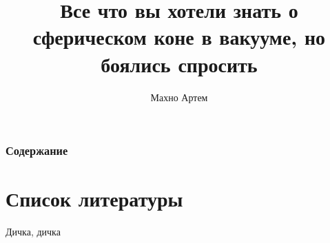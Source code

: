 \documentclass{beamer}
\begin{document}
\title{Все что вы хотели знать о сферическом коне в вакууме, но боялись спросить}  
\author{Махно Артем}
\date{}
\frame
{
	\titlepage 
	\small{}
} 
\frame
{
	\frametitle{Содержание}
	\section{Список литературы}
	Дичка, дичка
}
\end{document}
